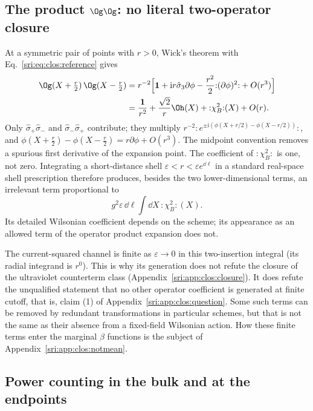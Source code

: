 \subsection{The product \texorpdfstring{$\Og\Og$}{OgOg}: no literal two-operator closure}\label{sri:app:clos:counterexample}
At a symmetric pair of points with $r>0$, Wick's theorem with Eq.~\eqref{sri:eq:clos:reference} gives
\begin{align}
 \Og(X+\tfrac r2)\,\Og(X-\tfrac r2)
 &=r^{-2}\Bigl[\mathbf 1+\mathrm i r\hat\sigma_3\partial\phi-\frac{r^2}{2}{:}(\partial\phi)^2{:}+O(r^3)\Bigr]
 \notag\\
 &=\frac{\mathbf 1}{r^2}+\frac{\sqrt2}{r}\Oh(X)+{:}\chi_B^2{:}(X)+O(r).
 \label{sri:eq:clos:ope}
\end{align}
Only $\hat\sigma_+\hat\sigma_-$ and $\hat\sigma_-\hat\sigma_+$ contribute; they multiply
$r^{-2}{:}e^{\pm\mathrm i(\phi(X+r/2)-\phi(X-r/2))}{:}$, and $\phi(X+\frac r2)-\phi(X-\frac r2)=r\partial\phi+O(r^3)$.
The midpoint convention removes a spurious first derivative of the expansion point. The coefficient of ${:}\chi_B^2{:}$
is one, not zero. Integrating a short-distance shell $\varepsilon<r<\varepsilon e^{\dd\ell}$ in a standard real-space
shell prescription therefore produces, besides the two lower-dimensional terms, an irrelevant term proportional to
\begin{equation}
 g^2\varepsilon\,\dd\ell\int\dd X\,{:}\chi_B^2{:}(X).
\end{equation}
Its detailed Wilsonian coefficient depends on the scheme; its appearance as an allowed term of the operator product
expansion does not.

The current-squared channel is finite as $\varepsilon\to0$ in this two-insertion integral (its radial integrand is
$r^0$). This is why its generation does not refute the closure of the ultraviolet counterterm class
(Appendix~\ref{sri:app:clos:closure}). It does refute the unqualified statement that no other operator coefficient is
generated at finite cutoff, that is, claim (1) of Appendix~\ref{sri:app:clos:question}. Some such terms can be removed by
redundant transformations in particular schemes, but that is not the same as their absence from a fixed-field
Wilsonian action. How these finite terms enter the marginal $\beta$ functions is the subject of
Appendix~\ref{sri:app:clos:notmean}.

\subsection{Power counting in the bulk and at the endpoints}\label{sri:app:clos:power}
